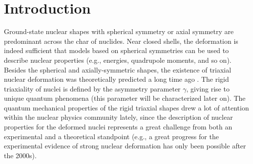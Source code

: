 \chapter{Introduction}

Ground-state nuclear shapes with spherical symmetry or axial symmetry are predominant across the char of nuclides. Near closed shells, the deformation is indeed sufficient that models based on spherical symmetries can be used to describe nuclear properties (e.g., energies, quadrupole moments, and so on). Besides the spherical and axially-symmetric shapes, the existence of triaxial nuclear deformation was theoretically predicted a long time ago \cite{bohr1998nuclear}. The rigid triaxiality of nuclei is defined by the asymmetry parameter $\gamma$, giving rise to unique quantum phenomena (this parameter will be characterized later on). The quantum mechanical properties of the rigid triaxial shapes drew a lot of attention within the nuclear physics community lately, since the description of nuclear properties for the deformed nuclei represents a great challenge from both an experimental and a theoretical standpoint (e.g., a great progress for the experimental evidence of strong nuclear deformation has only been possible after the 2000s).